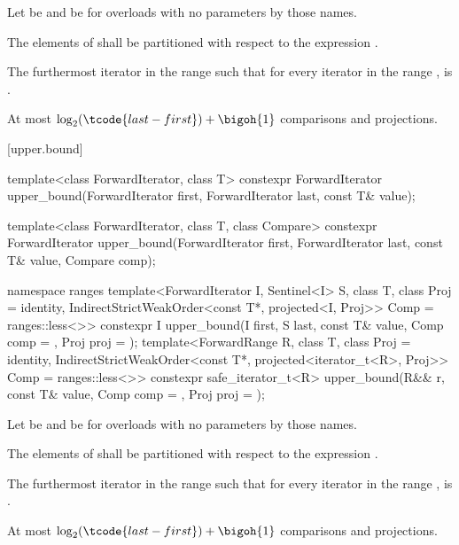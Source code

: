 \begin{itemdescr}
\pnum
Let  be  and
 be 
for overloads with no parameters by those names.

\pnum
\requires
The elements  of 
shall be partitioned with respect to the expression
.

\pnum
\returns
The furthermost iterator  in the range 
such that for every iterator  in the range ,
 is .

\pnum
\complexity
At most $\log_2(\tcode{last - first}) + \bigoh{1}$ comparisons and projections.
\end{itemdescr}

[upper.bound]{}

%
\begin{itemdecl}
template<class ForwardIterator, class T>
  constexpr ForwardIterator
    upper_bound(ForwardIterator first, ForwardIterator last,
                const T& value);

template<class ForwardIterator, class T, class Compare>
  constexpr ForwardIterator
    upper_bound(ForwardIterator first, ForwardIterator last,
                const T& value, Compare comp);

namespace ranges {
  template<ForwardIterator I, Sentinel<I> S, class T, class Proj = identity,
           IndirectStrictWeakOrder<const T*, projected<I, Proj>> Comp = ranges::less<>>
    constexpr I upper_bound(I first, S last, const T& value, Comp comp = {}, Proj proj = {});
  template<ForwardRange R, class T, class Proj = identity,
           IndirectStrictWeakOrder<const T*, projected<iterator_t<R>, Proj>> Comp =
             ranges::less<>>
    constexpr safe_iterator_t<R>
      upper_bound(R&& r, const T& value, Comp comp = {}, Proj proj = {});
}
\end{itemdecl}

\begin{itemdescr}
\pnum
Let  be  and
 be 
for overloads with no parameters by those names.

\pnum
\requires
The elements  of 
shall be partitioned with respect to the expression
.

\pnum
\returns
The furthermost iterator  in the range 
such that for every iterator  in the range ,
 is .

\pnum
\complexity
At most $\log_2(\tcode{last - first}) + \bigoh{1}$ comparisons and projections.
\end{itemdescr}

